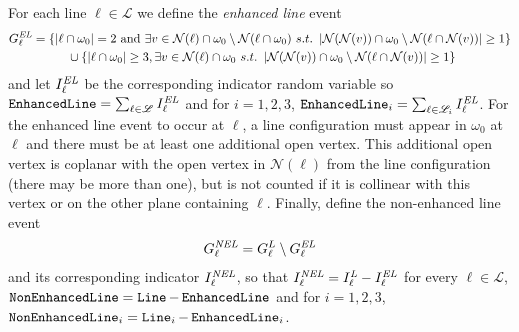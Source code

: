 \documentclass{amsart}
\newcommand{\vect}[1]{{ #1}}
\newcommand{\abs}[1]{\left|#1\right|}
\newcommand{\Lfoo}{I^{\text{\em L}}}
\newcommand{\EL}{I^{\text{\em EL}}}
\newcommand{\NEL}{I^{\text{\em NEL}}}
\newcommand{\lin}{\operatorname{\tt Line}}
\newcommand{\eline}{\operatorname{\tt Enhanced Line}}
\newcommand{\neline}{\operatorname{\tt NonEnhancedLine}}
\newcommand{\event}{G}
\numberwithin{equation}{section}
\newcommand{\lineset}{\mathscr{L}}
\newcommand{\Ln}{\ell}
\theoremstyle{definition}
\theoremstyle{remark}
\begin{document}
For each line $\Ln \in \lineset$ we define the {\em enhanced line} event
\begin{align*}
\event^{\text{\em EL}}_\Ln &= \{ \abs{\Ln \cap \omega_0} =2 \text{ and } \exists \vect{v}\in \mathcal{N}(\Ln)\cap \omega_0\setminus \mathcal{N}(\Ln \cap \omega_0) \ s.t.\ \abs{\mathcal{N}(\mathcal{N}(\vect{v})) \cap \omega_0 \setminus \mathcal{N}(\Ln \cap \mathcal{N}(v))}\geq 1\} \\
& \hspace{1cm} \cup \{ \abs{\Ln \cap \omega_0} \geq 3,  \exists \vect{v}\in \mathcal{N}(\Ln)\cap \omega_0 \ s.t.\ \abs{\mathcal{N}(\mathcal{N}(\vect{v})) \cap \omega_0 \setminus \mathcal{N}(\Ln \cap \mathcal{N}(v))}\geq 1 \} 
\end{align*}
and let $\EL_\Ln$ be the corresponding indicator random variable so $\eline = \sum_{\Ln \in \lineset} \EL_\Ln$ and for $i=1,2,3$, $\eline_i =  \sum_{\Ln \in \lineset_i} \EL_\Ln$.  For the enhanced line event to occur at $\Ln$, a line configuration must appear in $\omega_0$ at $\Ln$ and there must be at least one additional open vertex.  This additional open vertex is coplanar with the open vertex in $\mathcal{N}(\Ln)$ from the line configuration (there may be more than one), but is not counted if it is collinear with this vertex or on the other plane containing $\Ln$.  Finally, define the non-enhanced line event
\begin{align*}
\event^{\text{\em NEL}}_\Ln = \event^{L}_\Ln \setminus \event^{\text{\em EL}}_\Ln
\end{align*}
and its corresponding indicator $\NEL_\Ln$, so that $\NEL_\Ln = \Lfoo_\Ln - \EL_\Ln$ for every $\Ln \in \lineset$, $\neline = \lin - \eline$ and for $i=1,2,3$, $\neline_i = \lin_i - \eline_i$.
\end{document}
